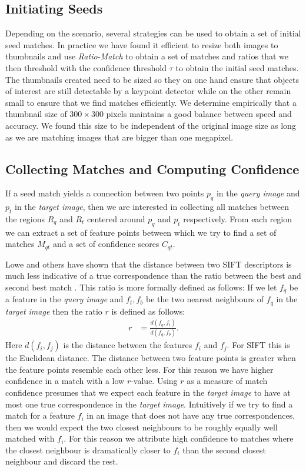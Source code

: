 \documentclass[10pt,twocolumn,letterpaper]{article}
\begin{document}
\subsection{Initiating Seeds}
\label{seeds}
%
Depending on the scenario, several strategies can be used to obtain a
set of initial seed matches. In practice we have found it efficient to
resize both images to thumbnails and use
\emph{Ratio-Match} to obtain a set of matches and ratios that we then
threshold with the confidence threshold $\tau$ to obtain the initial
seed matches. The thumbnails created need to be sized so they on one hand ensure that objects of interest are still detectable by a keypoint detector while on the other remain small to ensure that we find matches efficiently. We determine empirically that a thumbnail size of $300\times300$ pixels maintains a good balance between speed and accuracy. We found this size to be independent of the original image size as long as we are matching images that are bigger than one megapixel.

\subsection{Collecting Matches and Computing Confidence}
\label{collection}
%
If a seed match yields a connection between two points $p_q$ in the \emph{query image} and $p_t$ in the \emph{target image}, then we are interested in collecting all matches between the regions $R_q$ and $R_t$ centered around $p_q$ and $p_t$ respectively. From each region we can extract a set of feature points between which we try to find a set of matches $M_{qt} $ and a set of confidence scores $C_{qt}$.

Lowe and others have shown that the distance between two SIFT descriptors is much less indicative of a true correspondence than the ratio between the best and second best match \cite{lowe2004sift,mikolajczyk2005performance,moreels2007evaluation,rabin2009statistical}. This ratio is more formally defined as follows: If we let $f_q$ be a feature in the \emph{query image} and $f_t, f_b$ be the two nearest neighbours of $f_q$ in the \emph{target image} then the ratio $r$ is defined as follows:
\begin{align*}
    r %
        &= \frac{d(f_{q}, f_{t})}{d(f_{q}, f_{b})}.
\end{align*}
Here $d(f_i,f_j)$ is the distance between the features $f_i$ and $f_j$. For SIFT this is the Euclidean distance. The distance between two feature points is greater when the feature points resemble each other less. For this reason we have higher confidence in a match with a low $r$-value. Using $r$ as a measure of match confidence presumes that we expect each feature in the \emph{target image} to have at most one true correspondence in the \emph{target image}. Intuitively if we try to find a match for a feature $f_i$ in an image that does not have any true correspondences, then we would expect the two closest neighbours to be roughly equally well matched with $f_i$. For this reason we attribute high confidence to matches where the closest neighbour is dramatically closer to $f_i$ than the second closest neighbour and discard the rest.
\end{document}
